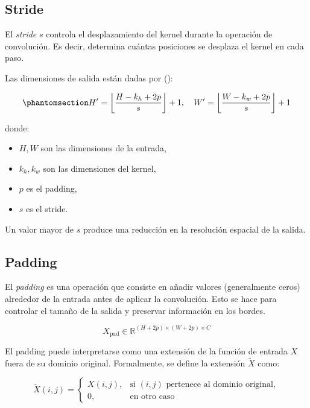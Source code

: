 \documentclass[
  spanish,
  us-letterpaper,
]{scrreprt}
\providecommand{\tightlist}{%
  \setlength{\itemsep}{0pt}\setlength{\parskip}{0pt}}
\theoremstyle{definition}
\theoremstyle{remark}
\begin{document}
\subsection{Stride}\label{stride}

El \emph{stride} \(s\) controla el desplazamiento del kernel durante la
operación de convolución. Es decir, determina cuántas posiciones se
desplaza el kernel en cada paso.

Las dimensiones de salida están dadas por
():

\begin{equation}\phantomsection\label{eq-output-dims}{
H' = \left\lfloor \frac{H - k_h + 2p}{s} \right\rfloor + 1, \quad
W' = \left\lfloor \frac{W - k_w + 2p}{s} \right\rfloor + 1
}\end{equation}

donde:

\begin{itemize}
\tightlist
\item
  \(H, W\) son las dimensiones de la entrada,
\item
  \(k_h, k_w\) son las dimensiones del kernel,
\item
  \(p\) es el padding,
\item
  \(s\) es el stride.
\end{itemize}

Un valor mayor de \(s\) produce una reducción en la resolución espacial
de la salida.

\subsection{Padding}\label{padding}

El \emph{padding} es una operación que consiste en añadir valores
(generalmente ceros) alrededor de la entrada antes de aplicar la
convolución. Esto se hace para controlar el tamaño de la salida y
preservar información en los bordes.

\[
X_{\text{pad}} \in \mathbb{R}^{(H+2p)\times(W+2p)\times C}
\]

El padding puede interpretarse como una extensión de la función de
entrada \(X\) fuera de su dominio original. Formalmente, se define la
extensión \(\tilde{X}\) como:

\[
\tilde{X}(i,j) =
\begin{cases}
X(i,j), & \text{si } (i,j) \text{ pertenece al dominio original}, \\
0, & \text{en otro caso}
\end{cases}
\]
\end{document}
